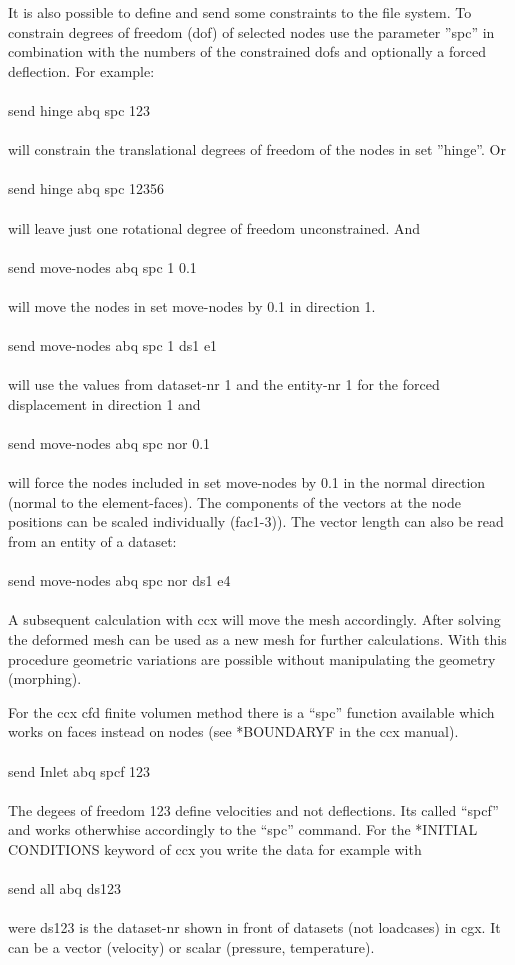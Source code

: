 \documentclass{article}
\begin{document}
It is also possible to define and send some constraints to the file system. To constrain degrees of freedom (dof) of selected nodes use the parameter ''spc'' in combination with the numbers of the constrained dofs and optionally a forced deflection. For example:\\\\send hinge abq spc 123\\\\will constrain the translational degrees of freedom of the nodes in set ''hinge''. Or\\\\send hinge abq spc 12356\\\\will leave just one rotational degree of freedom unconstrained. And\\\\send move-nodes abq spc 1 0.1\\\\will move the nodes in set move-nodes by 0.1 in direction 1.\\\\send move-nodes abq spc 1 ds1 e1\\\\will use the values from dataset-nr 1 and the entity-nr 1 for the forced displacement in direction 1 and\\\\send move-nodes abq spc nor 0.1\\\\ will force the nodes included in set move-nodes by 0.1 in the normal direction (normal to the element-faces). The components of the vectors at the node positions can be scaled individually (fac1-3)). The vector length can also be read from an entity of a dataset:\\\\send move-nodes abq spc nor ds1 e4\\\\ A subsequent calculation with ccx will move the mesh accordingly. After solving the deformed mesh can be used as a new mesh for further calculations. With this procedure geometric variations are possible without manipulating the geometry (morphing).

For the ccx cfd finite volumen method there is a ``spc'' function available which works on faces instead on nodes (see *BOUNDARYF in the ccx manual).\\\\send Inlet abq spcf 123\\\\The degees of freedom 123 define velocities and not deflections. Its called ``spcf'' and works otherwhise accordingly to the ``spc'' command. For the *INITIAL CONDITIONS keyword of ccx you write the data for example with\\\\send all abq ds123\\\\were ds123 is the dataset-nr shown in front of datasets (not loadcases) in cgx. It can be a vector (velocity) or scalar (pressure, temperature).
\end{document}
